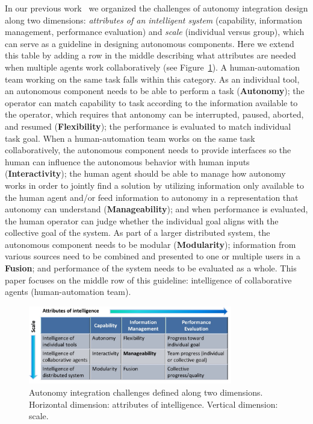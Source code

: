 \documentclass[journal]{IEEEtran}
\begin{document}
In our previous work~\cite{Lin2010Supporting} we organized the challenges of autonomy integration design along two dimensions: \textit{attributes of an intelligent system} (capability, information management, performance evaluation) and \textit{scale} (individual versus group), which can serve as a guideline in designing autonomous components. Here we extend this table by adding a row in the middle describing what attributes are needed when multiple agents work collaboratively (see Figure~\ref{IChallenges}). A human-automation team working on the same task falls within this category. As an individual tool, an autonomous component needs to be able to perform a task (\textbf{Autonomy}); the operator can match capability to task according to the information available to the operator, which requires that antonomy can be interrupted, paused, aborted, and resumed (\textbf{Flexibility}); the performance is evaluated to match individual task goal. When a human-automation team works on the same task collaboratively, the autonomous component needs to provide interfaces so the human can influence the autonomous behavior with human inputs (\textbf{Interactivity}); the human agent should be able to manage how autonomy works in order to jointly find a solution by utilizing information only available to the human agent and/or feed information to autonomy in a representation that autonomy can understand (\textbf{Manageability}); and when performance is evaluated, the human operator can judge whether the individual goal aligns with the collective goal of the system. As part of a larger distributed system, the autonomous component needs to be modular (\textbf{Modularity}); information from various sources need to be combined and presented to one or multiple users in a \textbf{Fusion}; and performance of the system needs to be evaluated as a whole. This paper focuses on the middle row of this guideline: intelligence of collaborative agents (human-automation team).

\begin{figure}
\centering
\includegraphics[width=3.5in]{IntegrationChallenges.JPG}
\caption{Autonomy integration challenges defined along two dimensions. Horizontal dimension: attributes of intelligence. Vertical dimension: scale.}
\label{IChallenges}
\end{figure}
\end{document}
